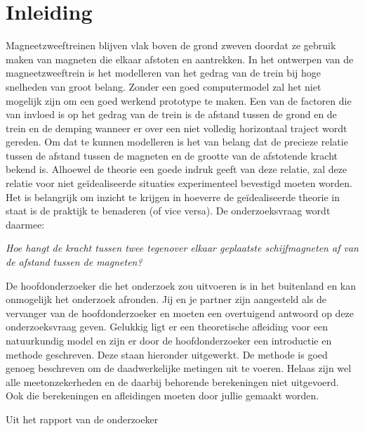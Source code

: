 \section{Inleiding}
Magneetzweeftreinen blijven vlak boven de grond zweven doordat ze gebruik maken van magneten die elkaar afstoten en aantrekken. In het ontwerpen van de magneetzweeftrein is het modelleren van het gedrag van de trein bij hoge snelheden van groot belang. Zonder een goed computermodel zal het niet mogelijk zijn om een goed werkend prototype te maken. \newline\newline
%
Een van de factoren die van invloed is op het gedrag van de trein is de afstand tussen de grond en de trein en de demping wanneer er over een niet volledig horizontaal traject wordt gereden. Om dat te kunnen modelleren is het van belang dat de precieze relatie tussen de afstand tussen de magneten en de grootte van de afstotende kracht bekend is. Alhoewel de theorie een goede indruk geeft van deze relatie, zal deze relatie voor niet ge\"{i}dealiseerde situaties experimenteel bevestigd moeten worden. Het is belangrijk om inzicht te krijgen in hoeverre de ge\"{i}dealiseerde theorie in staat is de praktijk te benaderen (of vice versa). De onderzoeksvraag wordt daarmee:
\newline
\begin{center}
\textit{Hoe hangt de kracht tussen twee tegenover elkaar geplaatste schijfmagneten af van de afstand tussen de magneten?}
\end{center}

\begin{framed}De hoofdonderzoeker die het onderzoek zou uitvoeren is in het buitenland en kan onmogelijk het onderzoek afronden. Jij en je partner zijn aangesteld als de vervanger van de hoofdonderzoeker en moeten een overtuigend antwoord op deze onderzoeksvraag geven. Gelukkig ligt er een theoretische afleiding voor een natuurkundig model en zijn er door de hoofdonderzoeker een introductie en methode geschreven. Deze staan hieronder uitgewerkt. De methode is goed genoeg beschreven om de daadwerkelijke metingen uit te voeren. Helaas zijn wel alle meetonzekerheden en de daarbij behorende berekeningen niet uitgevoerd. Ook die berekeningen en afleidingen moeten door jullie gemaakt worden.
\end{framed}

\newpage
\begin{center}
    \LARGE{Uit het rapport van de onderzoeker}
\end{center}

